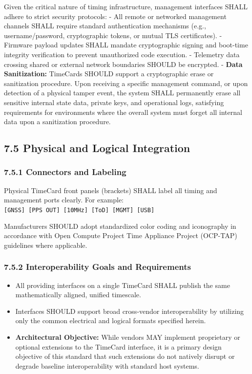 \documentclass[
]{article}
\begin{document}
Given the critical nature of timing infrastructure, management
interfaces SHALL adhere to strict security protocols: - All remote or
networked management channels SHALL require standard authentication
mechanisms (e.g., username/password, cryptographic tokens, or mutual TLS
certificates). - Firmware payload updates SHALL mandate cryptographic
signing and boot-time integrity verification to prevent unauthorized
code execution. - Telemetry data crossing shared or external network
boundaries SHOULD be encrypted. - \textbf{Data Sanitization:} TimeCards
SHOULD support a cryptographic erase or sanitization procedure. Upon
receiving a specific management command, or upon detection of a physical
tamper event, the system SHALL permanently erase all sensitive internal
state data, private keys, and operational logs, satisfying requirements
for environments where the overall system must forget all internal data
upon a sanitization procedure.

\subsection{7.5 Physical and Logical
Integration}\label{physical-and-logical-integration}

\subsubsection{7.5.1 Connectors and
Labeling}\label{connectors-and-labeling}

Physical TimeCard front panels (brackets) SHALL label all timing and
management ports clearly. For example:
{\texttt{{[}}}\texttt{GNSS}{\texttt{{]}}}\texttt{~}{\texttt{{[}}}\texttt{PPS~OUT}{\texttt{{]}}}\texttt{~}{\texttt{{[}}}\texttt{10MHz}{\texttt{{]}}}\texttt{~}{\texttt{{[}}}\texttt{ToD}{\texttt{{]}}}\texttt{~}{\texttt{{[}}}\texttt{MGMT}{\texttt{{]}}}\texttt{~}{\texttt{{[}}}\texttt{USB}{\texttt{{]}}}

Manufacturers SHOULD adopt standardized color coding and iconography in
accordance with Open Compute Project Time Appliance Project (OCP-TAP)
guidelines where applicable.

\subsubsection{7.5.2 Interoperability Goals and
Requirements}\label{interoperability-goals-and-requirements}

\begin{itemize}
\item
  All providing interfaces on a single TimeCard SHALL publish the same
  mathematically aligned, unified timescale.
\item
  Interfaces SHOULD support broad cross-vendor interoperability by
  utilizing only the common electrical and logical formats specified
  herein.
\item
  \textbf{Architectural Objective:} While vendors MAY implement
  proprietary or optional extensions to the TimeCard interface, it is a
  primary design objective of this standard that such extensions do not
  natively disrupt or degrade baseline interoperability with standard
  host systems.
\end{itemize}
\end{document}
